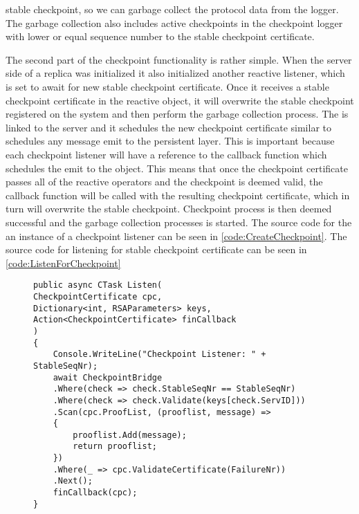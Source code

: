 stable checkpoint, so we can garbage collect the protocol data from the logger. The garbage collection also includes active checkpoints in the checkpoint logger with lower or equal sequence number to the stable checkpoint certificate. 

The second part of the checkpoint functionality is rather simple. When the server side of a replica was initialized it also initialized another reactive listener, which is set to await for new stable checkpoint certificate. Once it receives a stable checkpoint certificate in the reactive  object, it will overwrite the stable checkpoint registered on the system and then perform the garbage collection process. The  is linked to the server and it schedules the new checkpoint certificate similar to schedules any message emit to the persistent layer. This is important because each checkpoint listener will have a reference to the callback function which schedules the emit to the  object. This means that once the checkpoint certificate passes all of the reactive operators and the checkpoint is deemed valid, the callback function will be called with the resulting checkpoint certificate, which in turn will overwrite the stable checkpoint. Checkpoint process is then deemed successful and the garbage collection processes is started. The source code for the an instance of a checkpoint listener can be seen in \autoref{code:CreateCheckpoint}. The source code for listening for stable checkpoint certificate can be seen in \autoref{code:ListenForCheckpoint}

\begin{figure}[H]
	\centering
	\begin{lstlisting}[label = code:CreateCheckpoint, caption=Listener for checkpoint messages, captionpos = b, basicstyle=\scriptsize]
public async CTask Listen(
CheckpointCertificate cpc, 
Dictionary<int, RSAParameters> keys, 
Action<CheckpointCertificate> finCallback
)
{
    Console.WriteLine("Checkpoint Listener: " + StableSeqNr);
    await CheckpointBridge
    .Where(check => check.StableSeqNr == StableSeqNr)
    .Where(check => check.Validate(keys[check.ServID]))
    .Scan(cpc.ProofList, (prooflist, message) =>
    {
        prooflist.Add(message);
        return prooflist;
    })
    .Where(_ => cpc.ValidateCertificate(FailureNr))
    .Next();
    finCallback(cpc);
}
    \end{lstlisting}
\end{figure}

